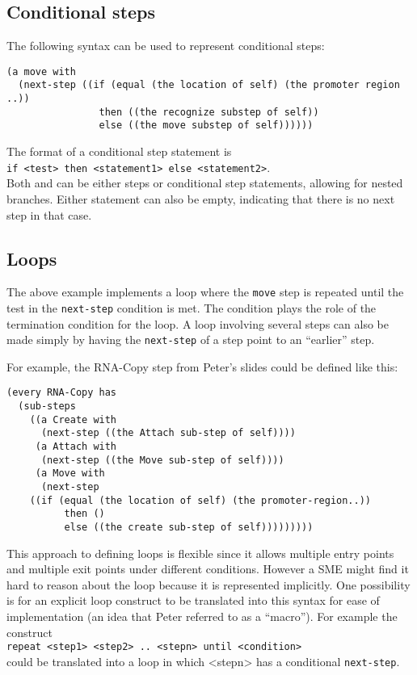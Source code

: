 \documentclass[fullpage]{article}
\begin{document}
\subsection*{Conditional steps}

The following syntax can be used to represent conditional steps:

{\small
\begin{verbatim}
(a move with
  (next-step ((if (equal (the location of self) (the promoter region ..))
                then ((the recognize substep of self))
                else ((the move substep of self))))))
\end{verbatim}
}

The format of a conditional step statement is \\ 
{\tt if <test> then <statement1> else <statement2>}.\\
%
Both {\tt <statement1>} and {\tt <statement2>} can be either steps or
conditional step statements, allowing for nested branches. Either
statement can also be empty, indicating that there is no next step in
that case.

\subsection*{Loops}

The above example implements a loop where the {\tt move} step is
repeated until the test in the {\tt next-step} condition is met.  The
condition plays the role of the termination condition for the loop. A
loop involving several steps can also be made simply by having the
{\tt next-step} of a step point to an ``earlier'' step.

For example, the RNA-Copy step from Peter's slides could be defined
like this:

{\small
\begin{verbatim}
(every RNA-Copy has
  (sub-steps
    ((a Create with
      (next-step ((the Attach sub-step of self))))
     (a Attach with
      (next-step ((the Move sub-step of self))))
     (a Move with
      (next-step
	((if (equal (the location of self) (the promoter-region..))
          then ()
          else ((the create sub-step of self)))))))))
\end{verbatim}
}

This approach to defining loops is flexible since it allows multiple
entry points and multiple exit points under different
conditions. However a SME might find it hard to reason about the loop
because it is represented implicitly. One possibility is for an
explicit loop construct to be translated into this syntax for ease of
implementation (an idea that Peter referred to as a ``macro''). For
example the construct \\ {\tt repeat <step1> <step2> .. <stepn> until
<condition>}\\ could be translated into a loop in which <stepn> has a
conditional {\tt next-step}.
\end{document}
